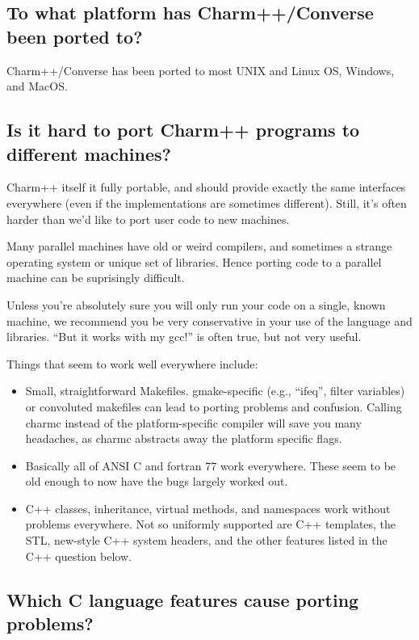 \subsection{To what platform has Charm++/Converse been ported to?}

Charm++/Converse has been ported to most UNIX and Linux OS, Windows, and MacOS.

\subsection{Is it hard to port Charm++ programs to different machines?}

\label{porting}
Charm++ itself it fully portable, and should provide exactly 
the same interfaces everywhere (even if the implementations are 
sometimes different).  Still, it's often harder than we'd like
to port user code to new machines.

Many parallel machines have old or weird compilers, and 
sometimes a strange operating system or unique set of libraries.  
Hence porting code to a parallel machine can be suprisingly difficult.

Unless you're absolutely sure you will only run your code on a
single, known machine, we recommend you be very conservative in 
your use of the language and libraries.  ``But it works with my gcc!''
is often true, but not very useful.

Things that seem to work well everywhere include:
\begin{itemize}
\item Small, straightforward Makefiles.  gmake-specific (e.g.,
``ifeq'', filter variables) or convoluted makefiles can lead 
to porting problems and confusion.  Calling charmc instead
of the platform-specific compiler will save you many headaches,
as charmc abstracts away the platform specific flags.
\item Basically all of ANSI C and fortran 77 work everywhere.  These seem 
to be old enough to now have the bugs largely worked out.
\item C++ classes, inheritance, virtual methods, and namespaces
work without problems everywhere.  Not so uniformly supported 
are C++ templates, the STL, new-style C++ system headers, 
and the other features listed in the C++ question below.
\end{itemize}

\subsection{Which C language features cause porting problems?}

